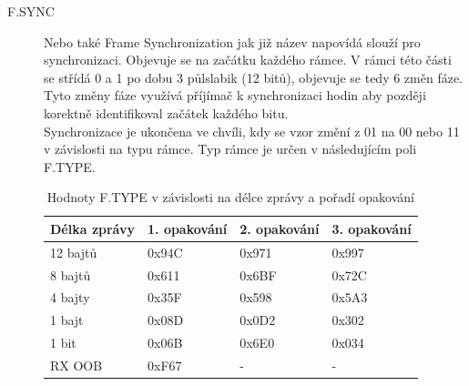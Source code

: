 \documentclass{ctuthesis}
\begin{document}
\begin{description}
\item[F.SYNC]
Nebo také Frame Synchronization jak již název napovídá slouží pro synchronizaci. Objevuje se na začátku každého rámce. V rámci této části se střídá 0 a 1 po dobu 3 půlslabik (12 bitů), objevuje se tedy 6 změn fáze. Tyto změny fáze využívá příjímač k synchronizaci hodin aby později korektně identifikoval začátek každého bitu.\\
Synchronizace je ukončena ve chvíli, kdy se vzor změní z 01 na 00 nebo 11 v závislosti na typu rámce. Typ rámce je určen v následujícím poli F.TYPE.

\begin{table}[]
\begin{tabular}{@{}llll@{}}
\toprule
Délka zprávy & 1. opakování & 2. opakování & 3. opakování \\ \midrule
12 bajtů     & 0x94C        & 0x971        & 0x997        \\
8 bajtů      & 0x611        & 0x6BF        & 0x72C        \\
4 bajty      & 0x35F        & 0x598        & 0x5A3        \\
1 bajt       & 0x08D        & 0x0D2        & 0x302        \\
1 bit        & 0x06B        & 0x6E0        & 0x034        \\
RX OOB       & 0xF67        & -            & -            \\ \bottomrule
\end{tabular}
\caption{Hodnoty F.TYPE v závislosti na délce zprávy a pořadí opakování}
\label{tab:ftype}
\end{table}


\end{description}
\end{document}
